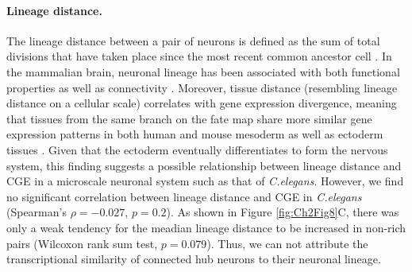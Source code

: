 {\paragraph{Lineage distance.}
The lineage distance between a pair of neurons is defined as the sum of total divisions that have taken place since the most recent common ancestor cell \citep{Pavlovic2014, Sulston1977, Sulston1983}.
In the mammalian brain, neuronal lineage has been associated with both functional properties \citep{Ciceri2013, Li2012} as well as connectivity \citep{Yu2012}.
Moreover, tissue distance (resembling lineage distance on a cellular scale) correlates with gene expression divergence, meaning that tissues from the same branch on the fate map share more similar gene expression patterns in both human and mouse mesoderm as well as ectoderm tissues \citep{Cui2007}.
Given that the ectoderm eventually differentiates to form the nervous system, this finding suggests a possible relationship between lineage distance and CGE in a microscale neuronal system such as that of \textit{C.elegans}.
However, we find no significant correlation between lineage distance and CGE in \textit{C.elegans} (Spearman's $\rho = -0.027$, $p = 0.2$).
As shown in Figure \ref{fig:Ch2Fig8}C, there was only a weak tendency for the meadian lineage distance to be increased in non-rich pairs (Wilcoxon rank sum test, $p = 0.079$).
Thus, we can not attribute the transcriptional similarity of connected hub neurons to their neuronal lineage.

}
